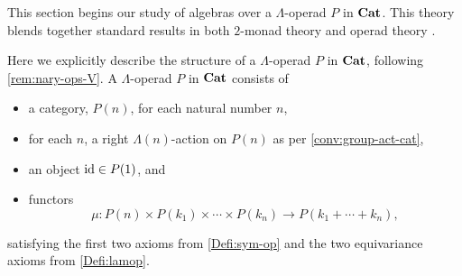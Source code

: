 This section begins our study of algebras over a $\Lambda$-operad $P$ in $\mathbf{Cat}$.
This theory blends together standard results in both $2$-monad theory \cite{lack-cod,BKP} and operad theory \cite{maygeom}.

\begin{rem}\label{rem:lop-in-cat}
Here we explicitly describe the structure of a $\Lambda$-operad $P$ in $\mathbf{Cat}$, following \cref{rem:nary-ops-V}.
A $\Lambda$-operad $P$ in $\mathbf{Cat}$ consists of
\begin{itemize}
\item a category, $P(n)$, for each natural number $n$,
\item for each $n$, a right $\Lambda(n)$-action on $P(n)$ as per \cref{conv:group-act-cat},
\item an object $\textrm{id} \in P(1)$, and
\item functors
  \[
    \mu \colon  P(n) \times P(k_{1}) \times \cdots \times P(k_{n}) \rightarrow P(k_{1} + \cdots + k_{n}),
  \]
\end{itemize}
satisfying the first two axioms from \cref{Defi:sym-op} and the two equivariance axioms from \cref{Defi:lamop}.
\end{rem}


